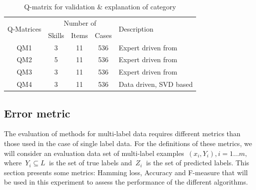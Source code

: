 \documentclass[12pt]{article}
\begin{document}
\begin{table}[h] 
\begin{center}
  \caption{Q-matrix for validation \& explanation of category}\label{tab:qm}
  \begin{tabular}{|ccccp{4cm}<{\raggedright}|}
  \hline
  \toprule
\multirow{2}{*}{Q-Matrices} & \multicolumn{3}{c}{Number of} & \multirow{2}{*|}{Description} \\
  \cline{2-4}
  & Skills &  Items & \multicolumn{1}{c}{Cases} & \\
  \midrule
QM1 & 3 & 11 & 536 & {Expert driven from \cite{henson2009defining} } \\
	\hline
QM2 & 5 & 11 & 536 & {Expert driven from \cite{de2008empirically} } \\  
 	\hline
QM3 & 3 & 11 & 536 & {Expert driven from \cite{CDM}} \\  
  	\hline 
QM4 & 3 & 11 & 536 & {Data driven, SVD based} \\  
  	\hline
  	\end{tabular}  
\end{center}	
\end{table}





\subsection{Error metric}\label{sec:eval-meas-princ}

The evaluation of methods for multi-label data requires different metrics than those used in the case of single label data. For the definitions of these metrics, we will consider an evaluation data set of multi-label examples~$(x_i ,Y_i ), i = 1...m, $ where~$ Y_i \subseteq L~$ is the set of true labels and~$ Z_i~$ is the set of predicted labels. This section presents some metrics: Hamming loss, Accuracy and  F-measure \cite{Tsoumakas2010MLD} that will be used in this experiment to
assess the performance of the different algorithms. 
\end{document}
